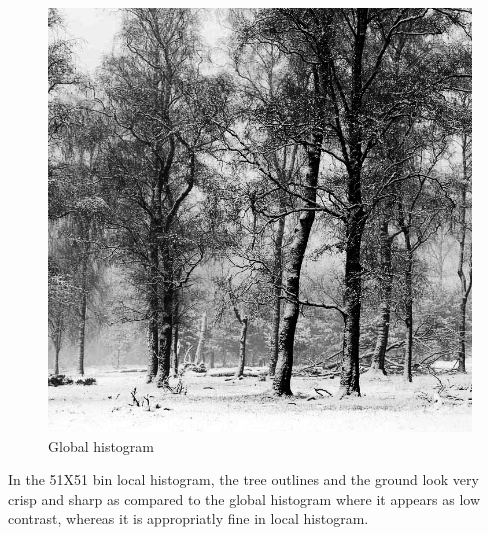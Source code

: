 \documentclass{article}
\begin{document}
\begin{figure}[!htb]
\begin{minipage}[b]{0.45\textwidth}
        \includegraphics[width=\textwidth]{LC2_global.png}
        \caption{Global histogram}
    \end{minipage}
\end{figure}

In the 51X51 bin local histogram, the tree outlines and the ground look very crisp and sharp as compared to the global histogram where it appears as low contrast, whereas it is appropriatly fine in local histogram.
\end{document}
